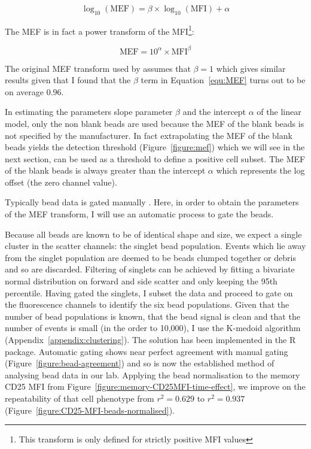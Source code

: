 \begin{equation}
    \log_{10}(\text{MEF})=\beta \times \log_{10}(\text{MFI}) + \alpha
\label{equ:MEF}
\end{equation}

The MEF is in fact a power transform of the MFI\footnote{This transform is only defined for strictly positive MFI values}:

\[
    \text{MEF}= 10^\alpha \times \text{MFI}^\beta
\]

The original MEF transform used by \citet{Dendrou:2009bl} assumes that $\beta=1$ which
gives similar results given that I found that the $\beta$ term in Equation~\ref{equ:MEF} turns out to be on average $0.96$.

In estimating the parameters slope parameter $\beta$ and the intercept $\alpha$ of the linear model,
only the non blank beads are used because the MEF of the blank beads is not specified by the manufacturer.
In fact extrapolating the MEF of the blank beads yields the detection threshold (Figure~\ref{figure:mef}) which we will see in the next section,
can be used as a threshold to define a positive cell subset.
The MEF of the blank beads is always greater than the intercept $\alpha$  which represents the log offset (the zero channel value).

Typically bead data is gated manually \citet{Dendrou:2009bl}.
Here, in order to obtain the parameters of the MEF transform, I will use an automatic process to gate the beads.

Because all beads are known to be of identical shape and size, we expect a single cluster in the scatter channels: the singlet bead population.
Events which lie away from the singlet population are deemed to be beads clumped together or debris and so are discarded.
Filtering of singlets can be achieved by fitting a bivariate normal distribution on forward and side scatter and only keeping the 95th percentile.
Having gated the singlets, I subset the data and proceed to gate on the fluorescence channels to identify the six bead populations.
Given that the number of bead populations is known, that the bead signal is clean and that the number of events is small (in the order to 10,000),
I use the K-medoid algorithm (Appendix~\ref{appendix:clustering}).
The solution has been implemented in the  R package.
Automatic gating shows near perfect agreement with manual gating (Figure~\ref{figure:bead-agreement}) and so is now the established method of analysing
bead data in our lab.
Applying the bead normalisation to the memory CD25 MFI from Figure~\ref{figure:memory-CD25MFI-time-effect}, we improve on the repeatability of that 
cell phenotype from $r^2=0.629$ to $r^2=0.937$ (Figure~\ref{figure:CD25-MFI-beads-normalised}).

